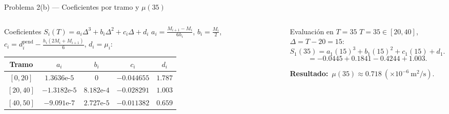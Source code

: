 \documentclass[aspectratio=169,10pt]{beamer}
\begin{document}
\begin{frame}{Problema 2(b) — Coeficientes por tramo y $\mu(35)$}
\begin{columns}[T]
\begin{column}{0.56\textwidth}
\begin{cardgear}{Coeficientes $S_i(T)=a_i\Delta^3+b_i\Delta^2+c_i\Delta+d_i$}{\faTable}
{\scriptsize $a_i=\tfrac{M_{i+1}-M_i}{6h_i}$, $b_i=\tfrac{M_i}{2}$, $c_i=d_i^{\text{pend}}-\tfrac{h_i(2M_i+M_{i+1})}{6}$, $d_i=\mu_i$:}\\[1mm]
\centering
{\scriptsize\renewcommand{\arraystretch}{1.3}\setlength{\tabcolsep}{4pt}
\begin{tabular}{c|cccc}
Tramo & $a_i$ & $b_i$ & $c_i$ & $d_i$\\\hline
$[0,20]$ & $1.3636\text{e-}5$ & $0$ & $-0.044655$ & $1.787$\\
$[20,40]$ & $-1.3182\text{e-}5$ & $8.182\text{e-}4$ & $-0.028291$ & $1.003$\\
$[40,50]$ & $-9.091\text{e-}7$ & $2.727\text{e-}5$ & $-0.011382$ & $0.659$\\
\end{tabular}}
\end{cardgear}
\end{column}
\begin{column}{0.42\textwidth}
\begin{cardgear}{Evaluación en $T=35$}{\faCalculator}
{\footnotesize $T=35\in[20,40]$, $\Delta=T-20=15$:
\[
S_1(35)=a_1(15)^3+b_1(15)^2+c_1(15)+d_1.
\]
\[
=-0.0445+0.1841-0.4244+1.003.
\]}
\end{cardgear}
\vspace{1mm}
\begin{cardnota}[\faCheckCircle]
{\footnotesize \textbf{Resultado:}\ $\mu(35)\approx0.718\ (\times10^{-6}\ \mathrm{m^2/s})$.}
\end{cardnota}
\end{column}
\end{columns}
\end{frame}
\end{document}
